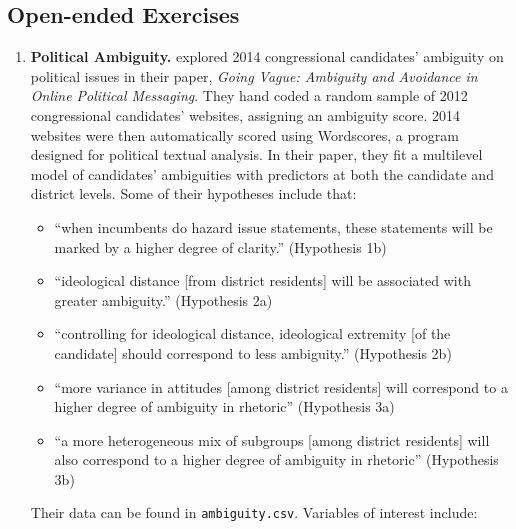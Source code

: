 \documentclass[
]{krantz}
\providecommand{\tightlist}{%
  \setlength{\itemsep}{0pt}\setlength{\parskip}{0pt}}
\begin{document}
\hypertarget{open-ended-exercises-3}{%
\subsection{Open-ended Exercises}\label{open-ended-exercises-3}}

\begin{enumerate}
\def\labelenumi{\arabic{enumi}.}
\item
  \textbf{Political Ambiguity.} \citet{Chapp2018} explored 2014 congressional candidates' ambiguity on political issues in their paper, \emph{Going Vague: Ambiguity and Avoidance in Online Political Messaging}. They hand coded a random sample of 2012 congressional candidates' websites, assigning an ambiguity score. 2014 websites were then automatically scored using Wordscores, a program designed for political textual analysis. In their paper, they fit a multilevel model of candidates' ambiguities with predictors at both the candidate and district levels. Some of their hypotheses include that:

  \begin{itemize}
  \tightlist
  \item
    ``when incumbents do hazard issue statements, these statements will be marked by a higher degree of clarity.'' (Hypothesis 1b)
  \item
    ``ideological distance {[}from district residents{]} will be associated with greater ambiguity.'' (Hypothesis 2a)
  \item
    ``controlling for ideological distance, ideological extremity {[}of the candidate{]} should correspond to less ambiguity.'' (Hypothesis 2b)
  \item
    ``more variance in attitudes {[}among district residents{]} will correspond to a higher degree of ambiguity in rhetoric'' (Hypothesis 3a)
  \item
    ``a more heterogeneous mix of subgroups {[}among district residents{]} will also correspond to a higher degree of ambiguity in rhetoric'' (Hypothesis 3b)
  \end{itemize}

  Their data can be found in \texttt{ambiguity.csv}. Variables of interest include:


\end{enumerate}
\end{document}
